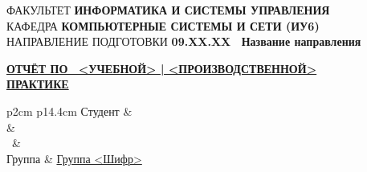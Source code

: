 \documentclass[12pt, left=30mm, right=10mm, top=20mm, bottom=20mm]{templateReportBMSTU}
\begin{document}
\begin{titlepage}
		\begin{center}
			\fontsize{12pt}{0.1\baselineskip}\selectfont
			\noindent\makebox[\linewidth]{\rule{\textwidth}{4pt}} \makebox[\linewidth]{\rule{\textwidth}{1pt}}
		\end{center}
		\begin{flushleft}
			\fontsize{12pt}{1\baselineskip}\selectfont 
			ФАКУЛЬТЕТ \textbf{ИНФОРМАТИКА И СИСТЕМЫ УПРАВЛЕНИЯ}
			\\ КАФЕДРА \textbf{КОМПЬЮТЕРНЫЕ СИСТЕМЫ И СЕТИ (ИУ6)}
			\\ НАПРАВЛЕНИЕ ПОДГОТОВКИ \textbf{09.XX.XX \ Название направления}
		\end{flushleft}

		\begin{center}
			\fontsize{18pt}{\baselineskip}\selectfont
			\textbf{\uline{ОТЧЁТ ПО \ <УЧЕБНОЙ> | <ПРОИЗВОДСТВЕННОЙ> }} %
			\\ \textbf{\uline{ПРАКТИКЕ}}
		\end{center}

		\begin{table}[h!]
			\fontsize{14pt}{0.7\baselineskip}\selectfont
			\begin{signstabular}{p{2cm} p{14.4cm}}
			Студент & \uline{\hfill}
			\\ \hfill & 
			\\ \ & \
			\\  Группа &  \uline{\hspace*{0.5cm}}\uline{Группа <Шифр>}\uline{\hspace*{0.5cm}}
			\end{signstabular}
		\end{table}
		

\end{titlepage}
\end{document}
